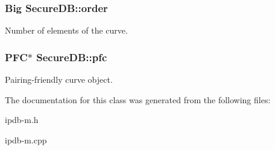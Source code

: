 \subsubsection[{\texorpdfstring{order}{order}}]{\setlength{\rightskip}{0pt plus 5cm}Big Secure\+D\+B\+::order}\hypertarget{classSecureDB_ae2cdeef405f4711ca5e17c6052c1d78a}{}\label{classSecureDB_ae2cdeef405f4711ca5e17c6052c1d78a}
Number of elements of the curve. 
\subsubsection[{\texorpdfstring{pfc}{pfc}}]{\setlength{\rightskip}{0pt plus 5cm}P\+FC$\ast$ Secure\+D\+B\+::pfc}\hypertarget{classSecureDB_a3feb6fe6c3928b757edcf0a04573bb1a}{}\label{classSecureDB_a3feb6fe6c3928b757edcf0a04573bb1a}
Pairing-\/friendly curve object. 

The documentation for this class was generated from the following files\+:\begin{DoxyCompactItemize}
\item 
ipdb-\/m.\+h\item 
ipdb-\/m.\+cpp\end{DoxyCompactItemize}
